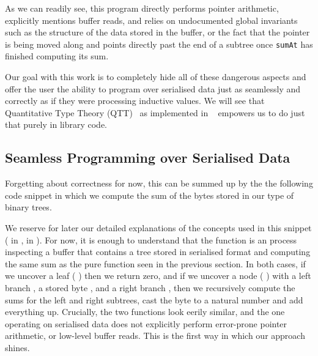 As we can readily see, this program
directly performs pointer arithmetic,
explicitly mentions buffer reads,
and relies on undocumented global invariants
such as the structure of the data stored in the buffer,
or the fact that the pointer is being moved along and points directly past
the end of a subtree once \texttt{sumAt} has finished computing
its sum.

Our goal with this work is to completely hide all of these
dangerous aspects
and offer the user the ability to program over serialised data
just as seamlessly and correctly as
if they were processing inductive values.
%
We will see that
Quantitative Type Theory (QTT)~\citep{DBLP:conf/birthday/McBride16, DBLP:conf/lics/Atkey18}
as implemented in \idris{}~\citep{DBLP:conf/ecoop/Brady21}
empowers us to do just that purely in library code.

\subsection{Seamless Programming over Serialised Data}\label{sec:seamless}

Forgetting about correctness for now, this can be summed up by the
the following code snippet in which we compute the sum of the bytes
stored in our type of binary trees.


We reserve for later our detailed explanations of the concepts
used in this snippet
( in ,
 in ).
%
For now, it is enough to understand that the function
is an  process
inspecting a buffer that contains a tree stored in serialised format
and computing the same sum as the pure function seen in the previous section.
%
In both cases, if we uncover a leaf
({ \IdrisData{\#}} \IdrisKeyword{\KatlaUnderscore{}})
then we return zero,
and if we uncover a node
({ \IdrisData{\#}}  \IdrisData{\#}  \IdrisData{\#} )
with
a left branch ,
a stored byte ,
and a right branch ,
then we recursively compute the sums for the left and right subtrees,
cast the byte to a natural number and add everything up.
%
Crucially, the two functions look eerily similar, and the one operating on
serialised data does not explicitly perform error-prone pointer arithmetic,
or low-level buffer reads.
%
This is the first way in which our approach shines.

